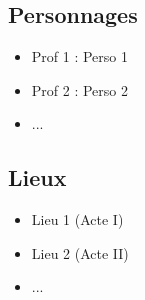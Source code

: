 \subsection{Personnages} 
\begin{itemize} \itemsep 4mm
	\item Prof 1 : Perso 1
	\item Prof 2 : Perso 2
	\item ...
\end{itemize}

\subsection{Lieux}
\begin{itemize} \itemsep 4mm
	\item Lieu 1 (Acte I)
	\item Lieu 2 (Acte II)
	\item ...
\end{itemize}


\begin{figure}[!h]
   \centering
   \quad
   \caption{}
\end{figure}




